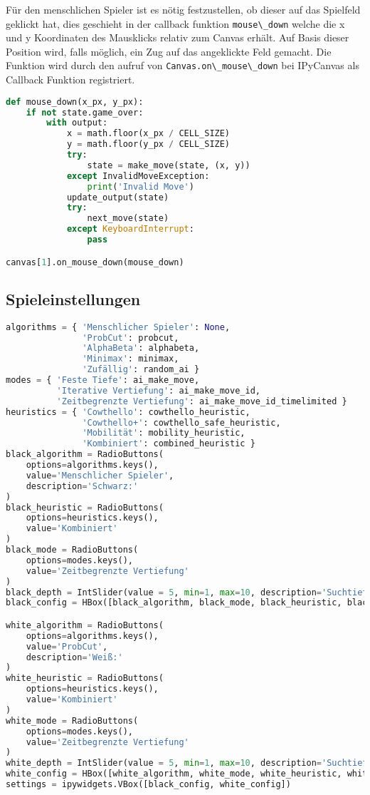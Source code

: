 Für den menschlichen Spieler ist es nötig festzustellen, ob dieser auf
das Spielfeld geklickt hat, dies geschieht in der callback funktion
\passthrough{\lstinline!mouse\_down!} welche die x und y Koordinaten des
Mausklicks relativ zum Canvas erhält. Auf Basis dieser Position wird,
falls möglich, ein Zug auf das angeklickte Feld gemacht. Die Funktion
wird durch den aufruf von
\passthrough{\lstinline!Canvas.on\_mouse\_down!} bei IPyCanvas als
Callback Funktion registriert.

\begin{lstlisting}[language=Python]
def mouse_down(x_px, y_px):
    if not state.game_over:
        with output:
            x = math.floor(x_px / CELL_SIZE)
            y = math.floor(y_px / CELL_SIZE)
            try:
                state = make_move(state, (x, y))
            except InvalidMoveException:
                print('Invalid Move')
            update_output(state)
            try:
                next_move(state)
            except KeyboardInterrupt:
                pass

canvas[1].on_mouse_down(mouse_down)
\end{lstlisting}

\hypertarget{spieleinstellungen}{%
\subsection{Spieleinstellungen}\label{spieleinstellungen}}

\begin{lstlisting}[language=Python]
algorithms = { 'Menschlicher Spieler': None,
               'ProbCut': probcut,
               'AlphaBeta': alphabeta,
               'Minimax': minimax,
               'Zufällig': random_ai }
modes = { 'Feste Tiefe': ai_make_move,
          'Iterative Vertiefung': ai_make_move_id,
          'Zeitbegrenzte Vertiefung': ai_make_move_id_timelimited }
heuristics = { 'Cowthello': cowthello_heuristic,
               'Cowthello+': cowthello_safe_heuristic,
               'Mobilität': mobility_heuristic,
               'Kombiniert': combined_heuristic }
black_algorithm = RadioButtons(
    options=algorithms.keys(),
    value='Menschlicher Spieler',
    description='Schwarz:'
)
black_heuristic = RadioButtons(
    options=heuristics.keys(),
    value='Kombiniert'
)
black_mode = RadioButtons(
    options=modes.keys(),
    value='Zeitbegrenzte Vertiefung'
)
black_depth = IntSlider(value = 5, min=1, max=10, description='Suchtiefe:')
black_config = HBox([black_algorithm, black_mode, black_heuristic, black_depth])

white_algorithm = RadioButtons(
    options=algorithms.keys(),
    value='ProbCut',
    description='Weiß:'
)
white_heuristic = RadioButtons(
    options=heuristics.keys(),
    value='Kombiniert'
)
white_mode = RadioButtons(
    options=modes.keys(),
    value='Zeitbegrenzte Vertiefung'
)
white_depth = IntSlider(value = 5, min=1, max=10, description='Suchtiefe:')
white_config = HBox([white_algorithm, white_mode, white_heuristic, white_depth])
settings = ipywidgets.VBox([black_config, white_config])
\end{lstlisting}

